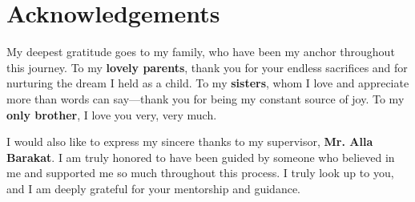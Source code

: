 %
%
\chapter{Acknowledgements}
\begin{SingleSpace}
My deepest gratitude goes to my family, who have been my anchor throughout this journey. To my \textbf{lovely parents}, thank you for your endless sacrifices and for nurturing the dream I held as a child. To my \textbf{sisters}, whom I love and appreciate more than words can say—thank you for being my constant source of joy. To my \textbf{only brother}, I love you very, very much. 

\medskip

I would also like to express my sincere thanks to my supervisor, \textbf{Mr. Alla Barakat}. I am truly honored to have been guided by someone who believed in me and supported me so much throughout this process. I truly look up to you, and I am deeply grateful for your mentorship and guidance.

\end{SingleSpace}
\clearpage